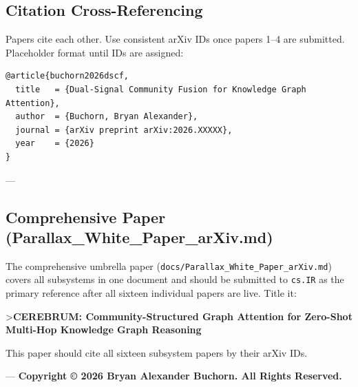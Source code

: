 \documentclass[10pt,journal,compsoc]{IEEEtran}
\begin{document}
\subsection{Citation Cross-Referencing}

Papers cite each other. Use consistent arXiv IDs once papers 1–4 are submitted. Placeholder format until IDs are assigned:

\begin{lstlisting}
@article{buchorn2026dscf,
  title   = {Dual-Signal Community Fusion for Knowledge Graph Attention},
  author  = {Buchorn, Bryan Alexander},
  journal = {arXiv preprint arXiv:2026.XXXXX},
  year    = {2026}
}
\end{lstlisting}

---

\subsection{Compre\-hensive Paper (Parallax\_White\_Paper\_arXiv.md)}

The compr\-ehensive umbrella paper (\texttt{docs/Parallax\_White\_Paper\_arXiv.md}) covers all subsystems in one document and should be submitted to \texttt{cs.IR} as the primary reference after all sixteen individual papers are live. Title it:

\textgreater  \textbf{CEREBRUM: Community-Structured Graph Attention for Zero-Shot Multi-Hop Knowledge Graph Reasoning}

This paper should cite all sixteen subsystem papers by their arXiv IDs.

---
\textbf{Copyright © 2026 Bryan Alexander Buchorn. All Rights Reserved.}




\end{document}
